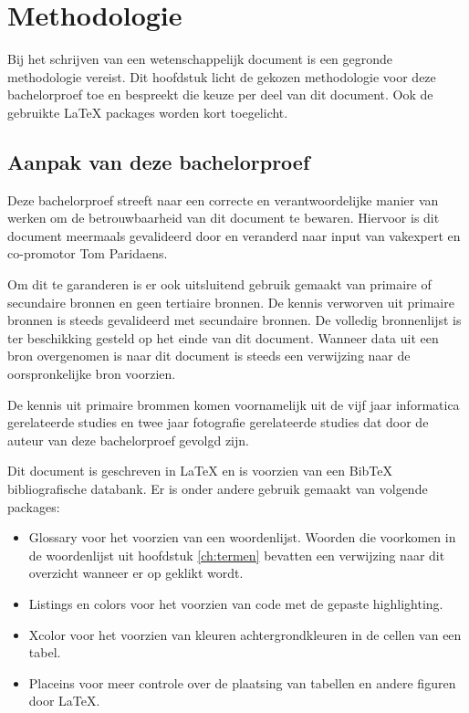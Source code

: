 
\chapter{Methodologie}
\label{ch:methodologie}

Bij het schrijven van een wetenschappelijk document is een gegronde methodologie vereist. Dit hoofdstuk licht de gekozen methodologie voor deze bachelorproef toe en bespreekt die keuze per deel van dit document. Ook de gebruikte \LaTeX{} packages worden kort toegelicht.

\section{Aanpak van deze bachelorproef}
\label{sec:aanpak-bachelorproef}

Deze bachelorproef streeft naar een correcte en verantwoordelijke manier van werken om de betrouwbaarheid van dit document te bewaren. Hiervoor is dit document meermaals gevalideerd door en veranderd naar input van vakexpert en co-promotor Tom Paridaens. 

Om dit te garanderen is er ook uitsluitend gebruik gemaakt van primaire of secundaire bronnen en geen tertiaire bronnen. De kennis verworven uit primaire bronnen is steeds gevalideerd met secundaire bronnen. De volledig bronnenlijst is ter beschikking gesteld op het einde van dit document. Wanneer data uit een bron overgenomen is naar dit document is steeds een verwijzing naar de oorspronkelijke bron voorzien. 

De kennis uit primaire brommen komen voornamelijk uit de vijf jaar informatica gerelateerde studies en twee jaar fotografie gerelateerde studies dat door de auteur van deze bachelorproef gevolgd zijn.

Dit document is geschreven in \LaTeX{} en is voorzien van een BibTeX bibliografische databank. Er is onder andere gebruik gemaakt van volgende packages: 

\begin{itemize}
	
	\item Glossary voor het voorzien van een woordenlijst. Woorden die voorkomen in de woordenlijst uit hoofdstuk \ref{ch:termen} bevatten een verwijzing naar dit overzicht wanneer er op geklikt wordt.
	
	\item Listings en colors voor het voorzien van code met de gepaste highlighting. 
	
	\item Xcolor voor het voorzien van kleuren achtergrondkleuren in de cellen van een tabel.
	
	\item Placeins voor meer controle over de plaatsing van tabellen en andere figuren door \LaTeX{}.
	
\end{itemize}

